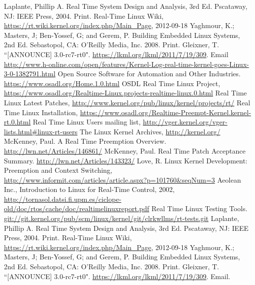 
\begin{thebibliography}{9}

Laplante, Phillip A. Real Time System Design and Analysis, 3rd Ed. Pscataway, NJ: IEEE Press, 2004. Print.
Real-Time Linux Wiki, \url{https://rt.wiki.kernel.org/index.php/Main_Page}, 2012-09-18
Yaghmour, K.; Masters, J; Ben-Yossef, G; and Gerem, P. Building Embedded Linux Systems, 2nd Ed. Sebastopol, CA: O'Reilly Media, Inc. 2008. Print.
Gleixner, T. ``[ANNOUNCE] 3.0-rc7-rt0". \url{https://lkml.org/lkml/2011/7/19/309}. Email
\url{http://www.h-online.com/open/features/Kernel-Log-real-time-kernel-goes-Linux-3-0-1382791.html}
Open Source Software for Automation and Other Industries. \url{https://www.osadl.org/Home.1.0.html}
OSDL Real Time Linux Project, \url{https://www.osadl.org/Realtime-Linux.projects-realtime-linux.0.html}
Real Time Linux Latest Patches, \url{http://www.kernel.org/pub/linux/kernel/projects/rt/}
Real Time Linux Installation, \url{https://www.osadl.org/Realtime-Preempt-Kernel.kernel-rt.0.html}
Real Time Linux Users mailing list, \url{http://vger.kernel.org/vger-lists.html#linux-rt-users}
The Linux Kernel Archives, \url{http://kernel.org/}
McKenney, Paul. A Real Time Preemption Overview. \url{http://lwn.net/Articles/146861/}
McKenney, Paul. Real Time Patch Acceptance Summary. \url{http://lwn.net/Articles/143323/}
Love, R. Linux Kernel Development: Preemption and Context Switching, \url{http://www.informit.com/articles/article.aspx?p=101760&seqNum=3}
Aeolean Inc., Introduction to Linux for Real-Time Control, 2002, \url{http://tornasol.datsi.fi.upm.es/ciclope-old/doc/rtos/cache/doc/realtimelinuxreport.pdf}
Real Time Linux Testing Tools. \url{git://git.kernel.org/pub/scm/linux/kernel/git/clrkwllms/rt-tests.git}
Laplante, Phillip A. Real Time System Design and Analysis, 3rd Ed. Pscataway, NJ: IEEE Press, 2004. Print.
Real-Time Linux Wiki, \url{https://rt.wiki.kernel.org/index.php/Main_Page}, 2012-09-18
Yaghmour, K.; Masters, J; Ben-Yossef, G; and Gerem, P. Building Embedded Linux Systems, 2nd Ed. Sebastopol, CA: O'Reilly Media, Inc. 2008. Print.
Gleixner, T. ``[ANNOUNCE] 3.0-rc7-rt0". \url{https://lkml.org/lkml/2011/7/19/309}. Email.

\end{thebibliography}
